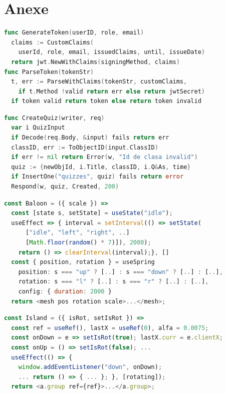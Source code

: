\chapter{Anexe}
\label{chapter:anexe}

\begin{lstlisting}[language=Go, caption={Generare și validare token JWT}, label={lst:jwt-token}]
func GenerateToken(userID, role, email)
  claims := CustomClaims(
    userId, role, email, issuedClaims, until, issueDate)
  return jwt.NewWithClaims(signingMethod, claims)
func ParseToken(tokenStr)
  t, err := ParseWithClaims(tokenStr, customClaims,
    if t.Method !valid return err else return jwtSecret)
  if token valid return token else return token invalid
\end{lstlisting}


\begin{lstlisting}[language=Go, caption={Funcția CreateQuiz pentru crearea unui quiz nou în MongoDB}, label={lst:create-quiz}]
func CreateQuiz(writer, req) 
  var i QuizInput
  if Decode(req.Body, &input) fails return err
  classID, err := ToObjectID(input.ClassID)
  if err != nil return Error(w, "Id de clasa invalid") 
  quiz := {newObjId, i.Title, classID, i.Q&As, time}
  if InsertOne("quizzes", quiz) fails return error
  Respond(w, quiz, Created, 200)
\end{lstlisting}

\begin{lstlisting}[language=JavaScript, basicstyle=\ttfamily\small, breaklines=true, caption={Exemplu de componentă React pentru un balon animat}, label={lst:react-baloon}]
const Baloon = ({ scale }) =>
  const [state s, setState] = useState("idle");
  useEffect => { interval = setInterval(() => setState(
      ["idle", "left", "right", ..]
      [Math.floor(random() * 7)]), 2000);
    return () => clearInterval(interval);}, []
  const { position, rotation } = useSpring
    position: s === "up" ? [..] : s === "down" ? [..] : [..],
    rotation: s === "l" ? [..] : s === "r" ? [..] : [..],
    config: { duration: 2000 }
  return <mesh pos rotation scale>...</mesh>;
\end{lstlisting}


\begin{lstlisting}[language=JavaScript, basicstyle=\ttfamily\small, breaklines=true, caption={Exemplu de animație a insulei meniului principal}, label={lst:react-island}]
const Island = ({ isRot, setIsRot }) =>
  const ref = useRef(), lastX = useRef(0), alfa = 0.0075;
  const onDown = e => setIsRot(true); lastX.curr = e.clientX;
  const onUp = () => setIsRot(false); ...
  useEffect(() => { 
    window.addEventListener("down", onDown);
    ... return () => { ... }; }, [rotating]);
  return <a.group ref={ref}>...</a.group>;
\end{lstlisting}

